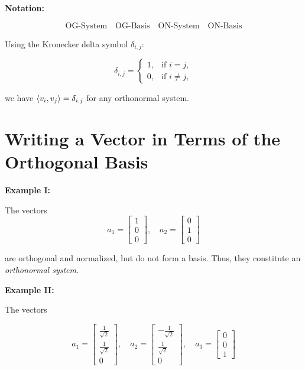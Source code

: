 \textbf{Notation:}

\[
    \text{OG-System} \quad \text{OG-Basis} \quad \text{ON-System} \quad \text{ON-Basis}
\]

Using the Kronecker delta symbol \( \delta_{i,j} \):

\[
    \delta_{i,j} =
    \begin{cases}
    1, & \text{if } i = j, \\
    0, & \text{if } i \neq j,
    \end{cases}
\]

we have \( \left\langle v_i, v_j\right\rangle = \delta_{i,j} \) for any orthonormal system.

\section{Writing a Vector in Terms of the Orthogonal Basis}

\textbf{Example I:}

The vectors
\[
    a_1 =
    \begin{bmatrix}
    1 \\
    0 \\
    0
    \end{bmatrix}, \quad
    a_2 =
    \begin{bmatrix}
    0 \\
    1 \\
    0
    \end{bmatrix}
\]

are orthogonal and normalized, but do not form a basis. Thus, they constitute an 
\emph{orthonormal system}.

\textbf{Example II:}

The vectors

\[
    a_1 =
    \begin{bmatrix}
    \frac{1}{\sqrt{2}} \\
    \frac{1}{\sqrt{2}} \\
    0
    \end{bmatrix}, \quad
    a_2 =
    \begin{bmatrix}
    -\frac{1}{\sqrt{2}} \\
    \frac{1}{\sqrt{2}} \\
    0
    \end{bmatrix}, \quad
    a_3 =
    \begin{bmatrix}
    0 \\
    0 \\
    1
    \end{bmatrix}
\]

